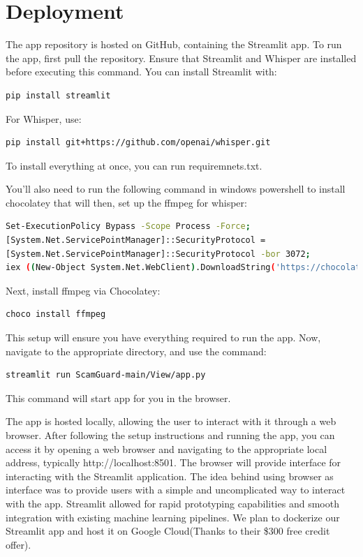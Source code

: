 \documentclass[11pt]{article}
\begin{document}
\section{Deployment}
The app repository is hosted on GitHub, containing the Streamlit app. To run the app, first pull the repository.
Ensure that Streamlit and Whisper are installed before executing this command. You can install Streamlit with:
\begin{lstlisting}[language=bash]
pip install streamlit
\end{lstlisting}
For Whisper, use:
\begin{lstlisting}[language=bash]
pip install git+https://github.com/openai/whisper.git
\end{lstlisting}
To install everything at once, you can run requiremnets.txt.

You'll also need to run the following command in windows powershell to install chocolatey that will then, set up the ffmpeg for whisper:

\begin{lstlisting}[language=bash]
Set-ExecutionPolicy Bypass -Scope Process -Force; 
[System.Net.ServicePointManager]::SecurityProtocol = 
[System.Net.ServicePointManager]::SecurityProtocol -bor 3072; 
iex ((New-Object System.Net.WebClient).DownloadString('https://chocolatey.org/install.ps1'))
\end{lstlisting}

Next, install ffmpeg via Chocolatey:
\begin{lstlisting}[language=bash]
choco install ffmpeg
\end{lstlisting}
This setup will ensure you have everything required to run the app.
Now, navigate to the appropriate directory, and use the command:
\begin{lstlisting}[language=bash]
streamlit run ScamGuard-main/View/app.py
\end{lstlisting}
This command will start app for you in the browser. 

The app is hosted locally, allowing the user to interact with it through a web browser. After following the setup instructions and running the app, you can access it by opening a web browser and navigating to the appropriate local address, typically http://localhost:8501. The browser will provide interface for interacting with the Streamlit application.
The idea behind using browser as interface was to provide users with a simple and uncomplicated way to interact with the app. Streamlit allowed for rapid prototyping capabilities and smooth integration with existing machine learning pipelines. We plan to dockerize our Streamlit app and host it on Google Cloud(Thanks to their \$300 free credit offer). 
\end{document}
